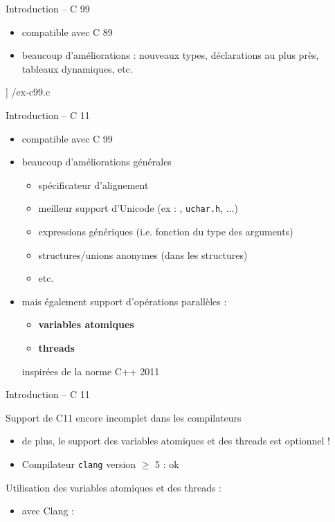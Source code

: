 \begin {frame} [fragile] {Introduction -- C 99}
    \begin {itemize}
	\item compatible avec C 89
	\item beaucoup d'améliorations : nouveaux types, déclarations
	    au plus près, tableaux dynamiques, etc.
    \end {itemize}

    \scriptsize\lstmonstyle] {\inc/ex-c99.c}
\end{frame}

\begin {frame} {Introduction -- C 11}
    \begin {itemize}
	\item compatible avec C 99
	\item beaucoup d'améliorations générales
	    \begin {itemize}
		\item spécificateur d'alignement
		\item meilleur support d'Unicode (ex : ,
		    \texttt {uchar.h}, ...)
		\item expressions génériques (i.e. fonction du type des
		    arguments)
		\item structures/unions anonymes (dans les structures)
		\item etc.
	    \end {itemize}
	\item mais également support d'opérations parallèles :
	    \begin {itemize}
		\item \textbf {variables atomiques}
		\item \textbf {threads}
	    \end {itemize}
	    \implique inspirées de la norme C++ 2011
    \end {itemize}
\end{frame}

\begin {frame} {Introduction -- C 11}

    Support de C11 encore incomplet dans les compilateurs
    \begin {itemize}
	\item de plus, le support des variables atomiques et des
	    threads est optionnel !
	\item Compilateur \texttt {clang} version $\geq$ 5 : ok

    \end {itemize}

    \vspace* {3mm}

    Utilisation des variables atomiques et des threads :
    \begin {itemize}
	\item avec Clang : 
    \end {itemize}
\end {frame}


